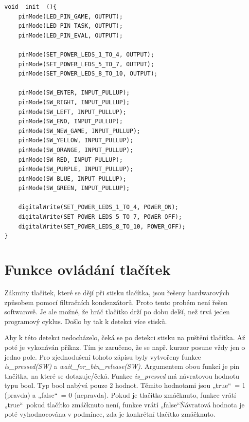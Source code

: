\begin{minipage}{\linewidth}
\begin{lstlisting}[frame=single,numbers=right,caption={Funkce pro úvodní inicializaci hardwaru.},label=lst:priklad.vypis.kodu.C,basicstyle=\ttfamily\small, keywordstyle=\color{black}\bfseries\underbar,]
void _init_ (){
    pinMode(LED_PIN_GAME, OUTPUT);
    pinMode(LED_PIN_TASK, OUTPUT);
    pinMode(LED_PIN_EVAL, OUTPUT);

    pinMode(SET_POWER_LEDS_1_TO_4, OUTPUT);
    pinMode(SET_POWER_LEDS_5_TO_7, OUTPUT);
    pinMode(SET_POWER_LEDS_8_TO_10, OUTPUT);

    pinMode(SW_ENTER, INPUT_PULLUP);
    pinMode(SW_RIGHT, INPUT_PULLUP);
    pinMode(SW_LEFT, INPUT_PULLUP);
    pinMode(SW_END, INPUT_PULLUP);
    pinMode(SW_NEW_GAME, INPUT_PULLUP);
    pinMode(SW_YELLOW, INPUT_PULLUP);
    pinMode(SW_ORANGE, INPUT_PULLUP);
    pinMode(SW_RED, INPUT_PULLUP);
    pinMode(SW_PURPLE, INPUT_PULLUP);
    pinMode(SW_BLUE, INPUT_PULLUP);
    pinMode(SW_GREEN, INPUT_PULLUP);

    digitalWrite(SET_POWER_LEDS_1_TO_4, POWER_ON); 
    digitalWrite(SET_POWER_LEDS_5_TO_7, POWER_OFF);
    digitalWrite(SET_POWER_LEDS_8_TO_10, POWER_OFF);
}
    \end{lstlisting}
    \end{minipage}

\section{Funkce ovládání tlačítek}
Zákmity tlačítek, které se dějí při stisku tlačítka, jsou řešeny hardwarových způsobem pomocí filtračních kondenzátorů. Proto tento probém
není řešen softwarově. Je ale možné, že hráč tlačítko drží po dobu delší, než trvá jeden programový cyklus. Došlo by tak k detekci více stisků.

Aby k této detekci nedocházelo, čeká se po detekci stisku na puštění tlačítka. Až poté je vykonáván příkaz. Tím je zaručeno, že se 
např. kurzor posune vždy jen o jedno pole. Pro zjednodušení tohoto zápisu byly vytvořeny funkce {\it is\_pressed(SW)} a {\it wait\_for\_btn\_release(SW)}.
Argumentem obou funkcí je pin tlačítka, na které se dotazuje/čeká. Funkce {\it is\_pressed} má návratovou hodnotu typu bool. Typ bool nabývá pouze 2 hodnot.
Těmito hodnotami jsou „true“\ = 1 (pravda) a „false“\ = 0 (nepravda). Pokud je tlačítko zmáčknuto, funkce vrátí „true“\, pokud tlačítko zmáčknuto není, 
funkce vrátí „false“\. Návratová hodnota je poté vyhodnocována v podmínce, zda je konkrétní tlačítko zmáčknuto. 

